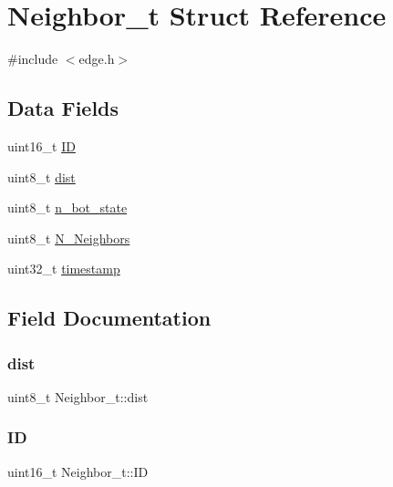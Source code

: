 \hypertarget{structNeighbor__t}{}\section{Neighbor\+\_\+t Struct Reference}
\label{structNeighbor__t}


{\ttfamily \#include $<$edge.\+h$>$}

\subsection*{Data Fields}
\begin{DoxyCompactItemize}
\item 
uint16\+\_\+t \hyperlink{structNeighbor__t_a9a827721dcdac2c8bebcdbb4124acc9d}{ID}
\item 
uint8\+\_\+t \hyperlink{structNeighbor__t_a753ae0c94c9dce9ecd4a1e397b4924dd}{dist}
\item 
uint8\+\_\+t \hyperlink{structNeighbor__t_a1838376247c20e5b4002ae51ee208982}{n\+\_\+bot\+\_\+state}
\item 
uint8\+\_\+t \hyperlink{structNeighbor__t_afcc619ea5925c878ae989d840eb5e7af}{N\+\_\+\+Neighbors}
\item 
uint32\+\_\+t \hyperlink{structNeighbor__t_a3b1aab4374c49f364f8460a3a274bec8}{timestamp}
\end{DoxyCompactItemize}


\subsection{Field Documentation}
\mbox{\label{structNeighbor__t_a753ae0c94c9dce9ecd4a1e397b4924dd}} 
\subsubsection{\texorpdfstring{dist}{dist}}
{\footnotesize\ttfamily uint8\+\_\+t Neighbor\+\_\+t\+::dist}

\mbox{\label{structNeighbor__t_a9a827721dcdac2c8bebcdbb4124acc9d}} 
\subsubsection{\texorpdfstring{ID}{ID}}
{\footnotesize\ttfamily uint16\+\_\+t Neighbor\+\_\+t\+::\+ID}

